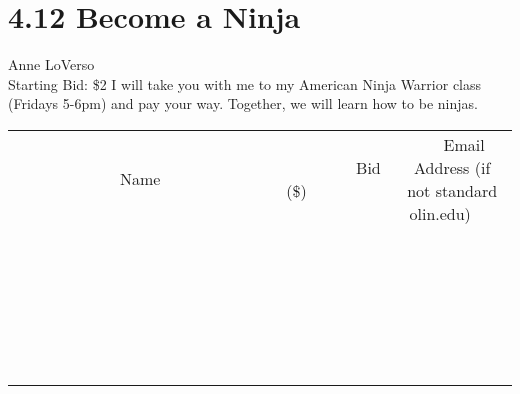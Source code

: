 \documentclass[11pt]{article}
\begin{document}
\section*{4.12 Become a Ninja}
Anne LoVerso
\\
Starting Bid: \$2
\newline
I will take you with me to my American Ninja Warrior class (Fridays 5-6pm) and pay your way.  Together, we will learn how to be ninjas.
\\[6ex]
\begin{tabular}{c c c}
~~~~~~~~~~~~~Name~~~~~~~~~~~~~ & ~~~~~~~~~Bid (\$)~~~~~~~~~  & ~~~Email Address (if not standard olin.edu)~~~\\
 & & \\
\hline
 & & \\
\hline
 & & \\
\hline
 & & \\
\hline
 & & \\
\hline
 & & \\
\hline
 & & \\
\hline
 & & \\
\hline
 & & \\
\hline
 & & \\
\hline
 & & \\
\hline
 & & \\
\hline
 & & \\
\hline
 & & \\
\hline
 & & \\
\hline
 & & \\
\hline
 & & \\
\hline
 & & \\
\hline
 & & \\
\hline
 & & \\
\hline
 & & \\
\hline
 & & \\
\hline
 & & \\
\hline
 & & \\
\hline
 & & \\
\hline
 & & \\
\hline
\end{tabular}
\newpage
\end{document}
